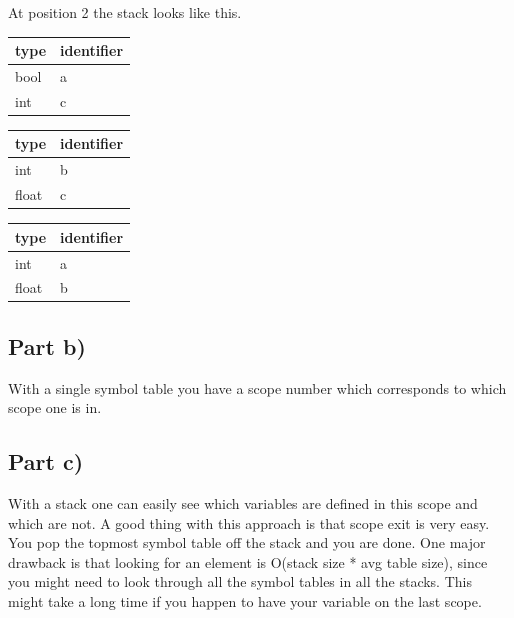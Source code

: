 \documentclass[paper=a4, fontsize=11pt]{scrartcl} %
\numberwithin{equation}{section} %
\numberwithin{figure}{section} %
\numberwithin{table}{section} %
\begin{document}
At position 2 the stack looks like this.
\begin{table}[ht!]
    \begin{center}
    \begin{tabular}{| l | l |}
    \hline
    type  & identifier \\
    \hline
    bool   & a          \\
    \hline
    int & c          \\
    \hline
    \end{tabular}
    \end{center}
\end{table}
\begin{table}[ht!]
    \begin{center}
    \begin{tabular}{| l | l |}
    \hline
    type  & identifier \\
    \hline
    int   & b          \\
    \hline
    float & c          \\
    \hline
    \end{tabular}
    \end{center}
\end{table}
\begin{table}[ht!]
    \begin{center}
    \begin{tabular}{| l | l |}
    \hline
    type  & identifier \\
    \hline
    int   & a          \\
    \hline
    float & b          \\
    \hline
    \end{tabular}
    \end{center}
\end{table}
\subsection{Part b)}
With a single symbol table you have a scope number which corresponds to which scope one is in.
\subsection{Part c)}
With a stack one can easily see which variables are defined in this scope and which are not.
A good thing with this approach is that scope exit is very easy. You pop the topmost symbol table off the stack and you are done.
One major drawback is that looking for an element is O(stack size * avg table size), since you might need to look through all the symbol tables in all the stacks.
This might take a long time if you happen to have your variable on the last scope.
\end{document}
